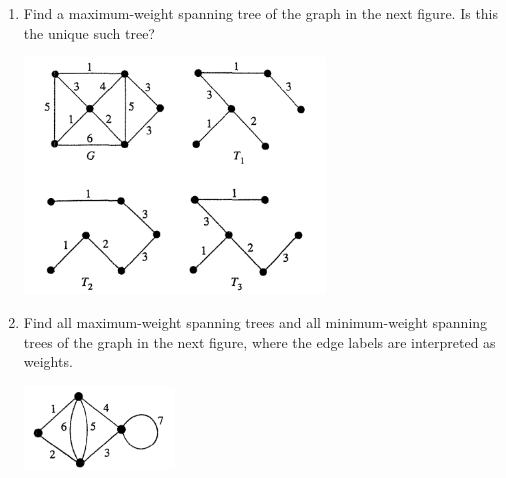 \prob
{
    \begin{enumerate}[label=(\roman*)]
        \item   Find a maximum-weight spanning tree of the graph in the next figure. Is this the unique such tree?
                \begin{center}
                    \includegraphics[width=8cm]{Test1/Problem14/Figure-i.png}
                \end{center}
                
        \item   Find all maximum-weight spanning trees and all minimum-weight spanning trees of the graph in the next
                figure, where the edge labels are interpreted as weights.
                \begin{center}
                    \includegraphics[width=4cm]{Test1/Problem14/Figure-ii.png}
                \end{center}
    \end{enumerate}
}
